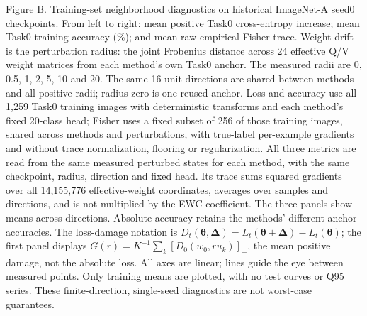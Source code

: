\caption{Figure B. Training-set neighborhood diagnostics on historical ImageNet-A seed0 checkpoints. From left to right: mean positive Task0 cross-entropy increase; mean Task0 training accuracy (\%); and mean raw empirical Fisher trace. Weight drift is the perturbation radius: the joint Frobenius distance across 24 effective Q/V weight matrices from each method's own Task0 anchor. The measured radii are 0, 0.5, 1, 2, 5, 10 and 20. The same 16 unit directions are shared between methods and all positive radii; radius zero is one reused anchor. Loss and accuracy use all 1,259 Task0 training images with deterministic transforms and each method's fixed 20-class head; Fisher uses a fixed subset of 256 of those training images, shared across methods and perturbations, with true-label per-example gradients and without trace normalization, flooring or regularization. All three metrics are read from the same measured perturbed states for each method, with the same checkpoint, radius, direction and fixed head. Its trace sums squared gradients over all 14,155,776 effective-weight coordinates, averages over samples and directions, and is not multiplied by the EWC coefficient. The three panels show means across directions. Absolute accuracy retains the methods' different anchor accuracies. The loss-damage notation is $D_t(\boldsymbol{\theta},\boldsymbol{\Delta})=L_t(\boldsymbol{\theta}+\boldsymbol{\Delta})-L_t(\boldsymbol{\theta})$; the first panel displays $G(r)=K^{-1}\sum_k[D_0(w_0,ru_k)]_+$, the mean positive damage, not the absolute loss. All axes are linear; lines guide the eye between measured points. Only training means are plotted, with no test curves or Q95 series. These finite-direction, single-seed diagnostics are not worst-case guarantees.}
